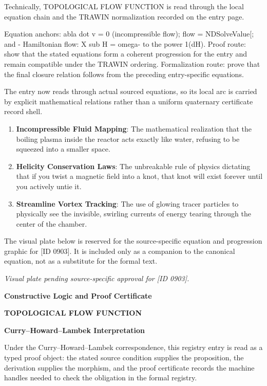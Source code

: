 Technically, TOPOLOGICAL FLOW FUNCTION is read through the local equation chain and the TRAWIN normalization recorded on the entry page.

Equation anchors: abla dot v = 0 (incompressible flow); flow = NDSolveValue[; and - Hamiltonian flow: X sub H = omega- to the power 1(dH). Proof route: show that the stated equations form a coherent progression for the entry and remain compatible under the TRAWIN ordering. Formalization route: prove that the final closure relation follows from the preceding entry-specific equations.

The entry now reads through actual sourced equations, so its local arc is carried by explicit mathematical relations rather than a uniform quaternary certificate record shell.
\endgroup

\begin{enumerate}[leftmargin=1.6em,itemsep=6pt,topsep=4pt]
\item \textbf{Incompressible Fluid Mapping}: The mathematical realization that the boiling plasma inside the reactor acts exactly like water, refusing to be squeezed into a smaller space.
\item \textbf{Helicity Conservation Laws}: The unbreakable rule of physics dictating that if you twist a magnetic field into a knot, that knot will exist forever until you actively untie it.
\item \textbf{Streamline Vortex Tracking}: The use of glowing tracer particles to physically see the invisible, swirling currents of energy tearing through the center of the chamber.
\end{enumerate}

\begingroup\footnotesize\sloppy
The visual plate below is reserved for the source-specific equation and progression graphic for [ID 0903]. It is included only as a companion to the canonical equation, not as a substitute for the formal text.
\par\endgroup
\begingroup\footnotesize\itshape
Visual plate pending source-specific approval for [ID 0903].
\par\endgroup

\clearpage
\begingroup\tzpsupportsetup
\noindent\textbf{\fontsize{10.8pt}{12.8pt}\selectfont [ID 0903] Constructive Logic and Proof Certificate}\par
\noindent\textbf{\fontsize{10pt}{12pt}\selectfont TOPOLOGICAL FLOW FUNCTION}\par
\vspace{0.45em}
\begingroup
\footnotesize
\setlength{\parskip}{0.22em}
\setlength{\parindent}{0pt}
\noindent\textbf{Curry--Howard--Lambek Interpretation}\par
Under the Curry--Howard--Lambek correspondence, this registry entry is read as a typed proof
object: the stated source condition supplies the proposition, the derivation supplies the
morphism, and the proof certificate records the machine handles needed to check the obligation
in the formal registry.

